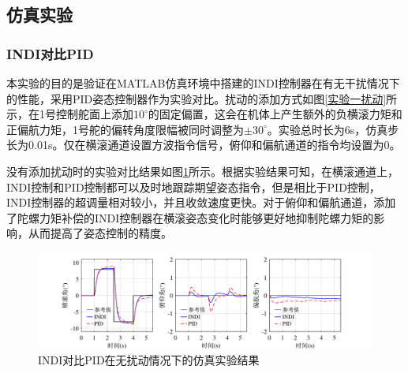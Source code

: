 \subsection{仿真实验}

\subsubsection{INDI对比PID}

本实验的目的是验证在MATLAB仿真环境中搭建的INDI控制器在有无干扰情况下的性能，采用PID姿态控制器作为实验对比。扰动的添加方式如图\ref{实验一扰动}所示，在1号控制舵面上添加$10^{\circ}$的固定偏置，这会在机体上产生额外的负横滚力矩和正偏航力矩，1号舵的偏转角度限幅被同时调整为$\pm30^{\circ}$。实验总时长为6s，仿真步长为0.01s。仅在横滚通道设置方波指令信号，俯仰和偏航通道的指令均设置为0。

没有添加扰动时的实验对比结果如图\ref{INDI对比PID仿真无扰动}所示。根据实验结果可知，在横滚通道上，INDI控制和PID控制都可以及时地跟踪期望姿态指令，但是相比于PID控制，INDI控制器的超调量相对较小，并且收敛速度更快。对于俯仰和偏航通道，添加了陀螺力矩补偿的INDI控制器在横滚姿态变化时能够更好地抑制陀螺力矩的影响，从而提高了姿态控制的精度。
\begin{figure}[htbp]
	\centering
	\begin{minipage}[c]{1\textwidth}
        \centering
        \includegraphics[scale=1]{Fig/INDI对比PID无扰动仿真实验结果.pdf}
        \caption{\label{INDI对比PID仿真无扰动}INDI对比PID在无扰动情况下的仿真实验结果}
        \end{minipage}
\end{figure}


